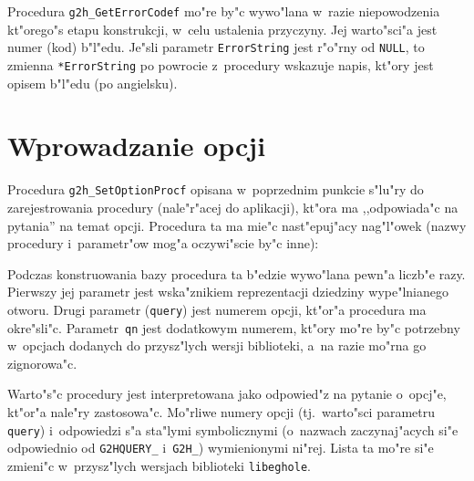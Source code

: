 \vspace{\bigskipamount}
Procedura \texttt{g2h\_GetErrorCodef} mo"re by"c wywo"lana w~razie
niepowodzenia kt"orego"s etapu konstrukcji, w~celu ustalenia przyczyny.
Jej warto"sci"a jest numer (kod) b"l"edu. Je"sli parametr \texttt{ErrorString}
jest r"o"rny od \texttt{NULL}, to zmienna \texttt{*ErrorString} po powrocie
z~procedury wskazuje napis, kt"ory jest opisem b"l"edu (po angielsku).


\section{\label{ssect:g2h:options}Wprowadzanie opcji}

Procedura \texttt{g2h\_SetOptionProcf} opisana w~poprzednim punkcie s"lu"ry
do zarejestrowania procedury (nale"r"acej do aplikacji), kt"ora ma ,,odpowiada"c
na pytania'' na temat opcji. Procedura ta ma mie"c nast"epuj"acy nag"l"owek
(nazwy procedury i~parametr"ow mog"a oczywi"scie by"c inne):

\vspace{\medskipamount}

\vspace{\medskipamount}
Podczas konstruowania bazy procedura ta b"edzie wywo"lana pewn"a liczb"e razy.
Pierwszy jej parametr jest wska"znikiem reprezentacji dziedziny wype"lnianego
otwo\-ru. Drugi parametr (\texttt{query}) jest numerem opcji, kt"or"a procedura
ma okre"sli"c. Parametr~\texttt{qn} jest dodatkowym numerem, kt"ory mo"re
by"c potrzebny w~opcjach dodanych do przysz"lych wersji biblioteki, a~na razie
mo"rna go zignorowa"c.

Warto"s"c procedury jest interpretowana jako odpowied"z na pytanie o~opcj"e,
kt"or"a nale"ry zastosowa"c. Mo"rliwe numery opcji (tj.\ warto"sci parametru
\texttt{query}) i~odpowiedzi s"a sta"lymi symbolicznymi (o~nazwach
zaczynaj"acych si"e odpowiednio od \texttt{G2HQUERY\_} i~\texttt{G2H\_})
wymienionymi ni"rej. Lista ta mo"re si"e zmieni"c w~przysz"lych wersjach
biblioteki \texttt{libeghole}.


